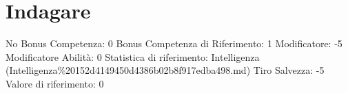 \section{Indagare}\label{indagare}

\begin{description}
\tightlist
\item[Tags: ABI]
No Bonus Competenza: 0 Bonus Competenza di Riferimento: 1 Modificatore:
-5 Modificatore Abilità: 0 Statistica di riferimento: Intelligenza
(Intelligenza\%20152d4149450d4386b02b8f917edba498.md) Tiro Salvezza: -5
Valore di riferimento: 0
\end{description}
